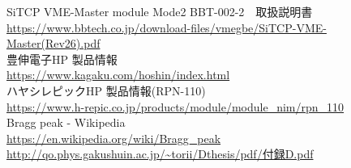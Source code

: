 \documentclass[a4paper,11pt,dvipdfmx]{jsarticle}
\begin{document}
\begin{thebibliography}{99}
   SiTCP VME-Master module Mode2 BBT-002-2　取扱説明書\\
  \url{https://www.bbtech.co.jp/download-files/vmegbe/SiTCP-VME-Master(Rev26).pdf}\\
  
   豊伸電子HP 製品情報\\
  \url{https://www.kagaku.com/hoshin/index.html}\\
  
   ハヤシレピックHP 製品情報(RPN-110)\\
  \url{https://www.h-repic.co.jp/products/module/module_nim/rpn_110}\\
  
   Bragg peak - Wikipedia \\
  \url{https://en.wikipedia.org/wiki/Bragg_peak}\\
  
   \url{http://qo.phys.gakushuin.ac.jp/~torii/Dthesis/pdf/付録D.pdf}
\end{thebibliography}
\end{document}
